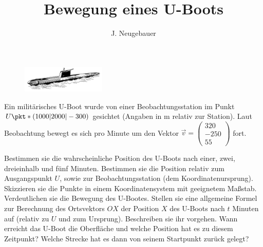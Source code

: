 \documentclass[10pt, a4paper]{scrartcl}
\author{J. Neugebauer}
\title{Bewegung eines U-Boots}
\date{\Heute}
\begin{document}
\ReiheTitel
\begin{aufgabe}
	\begin{figure}
		\includegraphics[width=4cm]{Q2-GK-AB.4-Abb_U-Boot.jpg}
	\end{figure}
	Ein militärisches U-Boot wurde von einer Beobachtungsstation im Punkt $U\pkt*(1000|2000|-300)$ 
	gesichtet (Angaben in \si{\meter} relativ zur Station). Laut Beobachtung bewegt es sich pro Minute
	um den Vektor $\vec{v} = \begin{pmatrix} 320 \\ -250 \\ 55 \end{pmatrix}$ fort.
		
	\begin{teilaufgaben}
		\teilaufgabe Bestimmen sie die wahrscheinliche Position des U-Boots nach einer, zwei, dreieinhalb und fünf Minuten. Bestimmen sie die Position relativ zum Ausgangspunkt $U$,
		sowie zur Beobachtungsstation (dem Koordinatenursprung).
		\teilaufgabe Skizzieren sie die Punkte in einem Koordinatensystem mit geeignetem Maßstab. 
		Verdeutlichen sie die Bewegung des U-Bootes.
		\teilaufgabe Stellen sie eine allgemeine Formel zur Berechnung des Ortsvektors $OX$ der Position $X$ des U-Boots nach $t$ Minuten auf (relativ zu $U$ und zum Ursprung). Beschreiben sie ihr vorgehen.
		\teilaufgabe\symStern Wann erreicht das U-Boot die Oberfläche und welche Position hat es zu diesem Zeitpunkt? Welche Strecke hat es dann von seinem Startpunkt zurück gelegt?
	\end{teilaufgaben}
\end{aufgabe}
\end{document}
